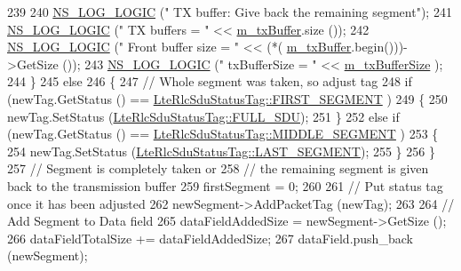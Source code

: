\begin{DoxyCode}
239 
240               \hyperlink{group__logging_ga88acd260151caf2db9c0fc84997f45ce}{NS\_LOG\_LOGIC} (\textcolor{stringliteral}{"    TX buffer: Give back the remaining segment"});
241               \hyperlink{group__logging_ga88acd260151caf2db9c0fc84997f45ce}{NS\_LOG\_LOGIC} (\textcolor{stringliteral}{"    TX buffers = "} << \hyperlink{classns3_1_1LteRlcUm_ac2c10aa57585dbea3797d651f3dce7be}{m\_txBuffer}.size ());
242               \hyperlink{group__logging_ga88acd260151caf2db9c0fc84997f45ce}{NS\_LOG\_LOGIC} (\textcolor{stringliteral}{"    Front buffer size = "} << (*(
      \hyperlink{classns3_1_1LteRlcUm_ac2c10aa57585dbea3797d651f3dce7be}{m\_txBuffer}.begin()))->GetSize ());
243               \hyperlink{group__logging_ga88acd260151caf2db9c0fc84997f45ce}{NS\_LOG\_LOGIC} (\textcolor{stringliteral}{"    txBufferSize = "} << \hyperlink{classns3_1_1LteRlcUm_a22ba9f6bd98fd3b905155ae0d0182b0d}{m\_txBufferSize} );
244             \}
245           \textcolor{keywordflow}{else}
246             \{
247               \textcolor{comment}{// Whole segment was taken, so adjust tag}
248               \textcolor{keywordflow}{if} (newTag.GetStatus () == \hyperlink{classns3_1_1LteRlcSduStatusTag_ae7822c5cc0d54a3d193b09a91ed6f133afda65e6233ba6fd1cd8aacf54cd11269}{LteRlcSduStatusTag::FIRST\_SEGMENT}
      )
249                 \{
250                   newTag.SetStatus (\hyperlink{classns3_1_1LteRlcSduStatusTag_ae7822c5cc0d54a3d193b09a91ed6f133ade41b0025c66cd211e992196f314d4a5}{LteRlcSduStatusTag::FULL\_SDU});
251                 \}
252               \textcolor{keywordflow}{else} \textcolor{keywordflow}{if} (newTag.GetStatus () == \hyperlink{classns3_1_1LteRlcSduStatusTag_ae7822c5cc0d54a3d193b09a91ed6f133a37a54694d337625c0c8541e3008d1d64}{LteRlcSduStatusTag::MIDDLE\_SEGMENT}
      )
253                 \{
254                   newTag.SetStatus (\hyperlink{classns3_1_1LteRlcSduStatusTag_ae7822c5cc0d54a3d193b09a91ed6f133a4e59540a0a5c4530b61e4feda355be7b}{LteRlcSduStatusTag::LAST\_SEGMENT});
255                 \}
256             \}
257           \textcolor{comment}{// Segment is completely taken or}
258           \textcolor{comment}{// the remaining segment is given back to the transmission buffer}
259           firstSegment = 0;
260 
261           \textcolor{comment}{// Put status tag once it has been adjusted}
262           newSegment->AddPacketTag (newTag);
263 
264           \textcolor{comment}{// Add Segment to Data field}
265           dataFieldAddedSize = newSegment->GetSize ();
266           dataFieldTotalSize += dataFieldAddedSize;
267           dataField.push\_back (newSegment);

\end{DoxyCode}
